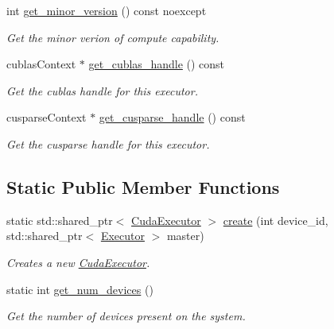 \begin{DoxyCompactItemize}
int \hyperlink{classgko_1_1CudaExecutor_aa7d7a5cd7aeb38b8ab8fe3e4d1538481}{get\+\_\+minor\+\_\+version} () const noexcept
\begin{DoxyCompactList}\small\item\em Get the minor verion of compute capability. \end{DoxyCompactList}\item 
cublas\+Context $\ast$ \hyperlink{classgko_1_1CudaExecutor_a5b5f8febb914c9984bc77b15e7bb7601}{get\+\_\+cublas\+\_\+handle} () const
\begin{DoxyCompactList}\small\item\em Get the cublas handle for this executor. \end{DoxyCompactList}\item 
cusparse\+Context $\ast$ \hyperlink{classgko_1_1CudaExecutor_ade84197157cc2695e5c94310692ab323}{get\+\_\+cusparse\+\_\+handle} () const
\begin{DoxyCompactList}\small\item\em Get the cusparse handle for this executor. \end{DoxyCompactList}\end{DoxyCompactItemize}
\subsection*{Static Public Member Functions}
\begin{DoxyCompactItemize}
\item 
static std\+::shared\+\_\+ptr$<$ \hyperlink{classgko_1_1CudaExecutor}{Cuda\+Executor} $>$ \hyperlink{classgko_1_1CudaExecutor_a2718a92034350650ef406ffdb60db090}{create} (int device\+\_\+id, std\+::shared\+\_\+ptr$<$ \hyperlink{classgko_1_1Executor}{Executor} $>$ master)
\begin{DoxyCompactList}\small\item\em Creates a new \hyperlink{classgko_1_1CudaExecutor}{Cuda\+Executor}. \end{DoxyCompactList}\item 
\mbox{\label{classgko_1_1CudaExecutor_aef0258494d14de0e56149b920c5173e5}} 
static int \hyperlink{classgko_1_1CudaExecutor_aef0258494d14de0e56149b920c5173e5}{get\+\_\+num\+\_\+devices} ()
\begin{DoxyCompactList}\small\item\em Get the number of devices present on the system. \end{DoxyCompactList}\end{DoxyCompactItemize}
